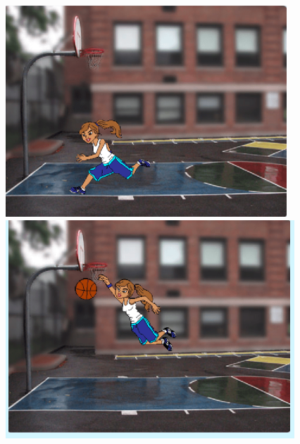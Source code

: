 \documentclass[10pt, a4paper]{article}
\begin{document}
\begin{enumerate}
        \begin{figure}[htbp]
            \centering
            \begin{minipage}{.3\textwidth}
                \centering
                \includegraphics[width=\textwidth]{37-1.png}
            \end{minipage}
            \begin{minipage}{.3\textwidth}
                \centering
                \includegraphics[width=\textwidth]{37-2.png}
            \end{minipage}
            \begin{minipage}{.3\textwidth}
                \centering

\end{minipage}
\end{figure}
\end{enumerate}
\end{document}
